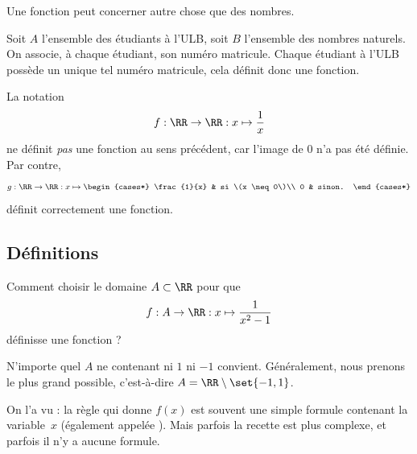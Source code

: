 \documentclass[french,xcolor=svgnames]{beamer}
\begin{document}
\begin{frame}
  Une fonction peut concerner autre chose que des nombres.
  \begin{example}
    Soit \(A\) l'ensemble des étudiants à l'ULB,\pause{} soit \(B\) l'ensemble des nombres naturels.\pause{} On associe, à chaque étudiant, son numéro matricule.\pause{} Chaque étudiant à l'ULB possède un unique tel numéro matricule, cela définit donc une fonction.
  \end{example}\pause
  \begin{example}La notation
    \begin{equation*}
      f : \RR \to \RR : x \mapsto \frac{1}{x}
    \end{equation*}
    ne définit \emph{pas} une fonction au sens précédent, car l'image de \(0\) n'a pas été définie.\pause{} Par contre,
    \begin{equation*}
      g : \RR \to \RR : x \mapsto
      \begin{cases*}
        \frac{1}{x} & si \(x \neq 0\)\\
        0 & sinon.
      \end{cases*}
    \end{equation*}
    définit correctement une fonction.
  \end{example}
\end{frame}

\subsection{Définitions}
\begin{frame}
  \begin{exercise}
    Comment choisir le domaine \(A \subset \RR\)\pause{} pour que
    \begin{equation*}
      f : A \to \RR : x \mapsto \frac{1}{x^{2}-1}
    \end{equation*}
    définisse une fonction ?\pause{}

    \begin{answer}
    N'importe quel \(A\) ne contenant ni \(1\) ni \(-1\) convient.\pause{} Généralement, nous prenons \og le plus grand possible\fg{},\pause{} c'est-à-dire \(A = \RR\setminus\set{-1,1}\).
  \end{answer}




  \end{exercise}\pause
  \begin{remark*}
    On l'a vu : la règle qui donne $f(x)$ est souvent une simple formule contenant la variable~$x$\pause{} (également appelée ).\pause{} Mais parfois la recette est plus complexe, et parfois il n'y a aucune formule.\pause{}
  \end{remark*}
\end{frame}
\end{document}
